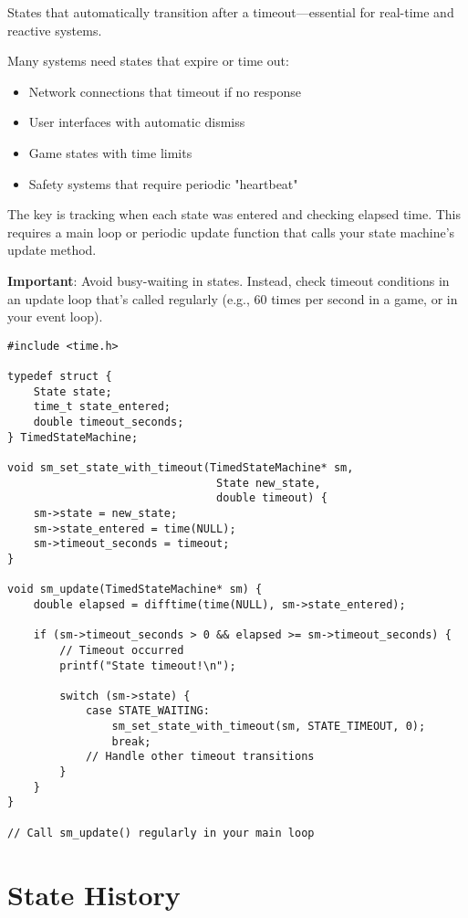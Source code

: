States that automatically transition after a timeout—essential for real-time and reactive systems.

Many systems need states that expire or time out:
\begin{itemize}
    \item Network connections that timeout if no response
    \item User interfaces with automatic dismiss
    \item Game states with time limits
    \item Safety systems that require periodic "heartbeat"
\end{itemize}

The key is tracking when each state was entered and checking elapsed time. This requires a main loop or periodic update function that calls your state machine's update method.

\textbf{Important}: Avoid busy-waiting in states. Instead, check timeout conditions in an update loop that's called regularly (e.g., 60 times per second in a game, or in your event loop).

\begin{lstlisting}
#include <time.h>

typedef struct {
    State state;
    time_t state_entered;
    double timeout_seconds;
} TimedStateMachine;

void sm_set_state_with_timeout(TimedStateMachine* sm,
                                State new_state,
                                double timeout) {
    sm->state = new_state;
    sm->state_entered = time(NULL);
    sm->timeout_seconds = timeout;
}

void sm_update(TimedStateMachine* sm) {
    double elapsed = difftime(time(NULL), sm->state_entered);

    if (sm->timeout_seconds > 0 && elapsed >= sm->timeout_seconds) {
        // Timeout occurred
        printf("State timeout!\n");

        switch (sm->state) {
            case STATE_WAITING:
                sm_set_state_with_timeout(sm, STATE_TIMEOUT, 0);
                break;
            // Handle other timeout transitions
        }
    }
}

// Call sm_update() regularly in your main loop
\end{lstlisting}

\section{State History}

